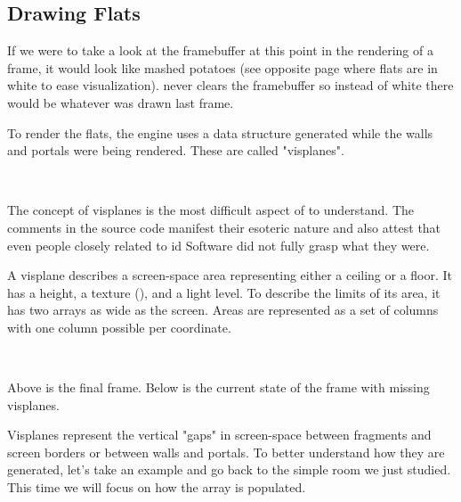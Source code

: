 \subsection{Drawing Flats}
 If we were to take a look at the framebuffer at this point in the rendering of a frame, it would look like mashed potatoes (see opposite page where flats are in white to ease visualization). \doom{} never clears the framebuffer so instead of white there would be whatever was drawn last frame.\\
\par
To render the flats, the engine uses a data structure generated while the walls and portals were being rendered. These are called "visplanes".\\
\par
{}\\
\par
The concept of visplanes is the most difficult aspect of \doom{} to understand. The comments in the source code manifest their esoteric nature and also attest that even people closely related to id Software did not fully grasp what they were.\\
\par
A visplane describes a screen-space area representing either a ceiling or a floor. It has a height, a texture (), and a light level. To describe the limits of its area, it has two arrays as wide as the screen. Areas are represented as a set of columns with one column possible per  coordinate.\\
\par
{}\\
\par
{}

 \label{mashed_potatoes1.png}

Above is the final frame. Below is the current state of the frame with missing visplanes.

\vspace{4mm}
Visplanes represent the vertical "gaps" in screen-space between fragments and screen borders or between walls and portals. To better understand how they are generated, let's take an example and go back to the simple room we just studied. This time we will focus on how the  array is populated.\\
\par

